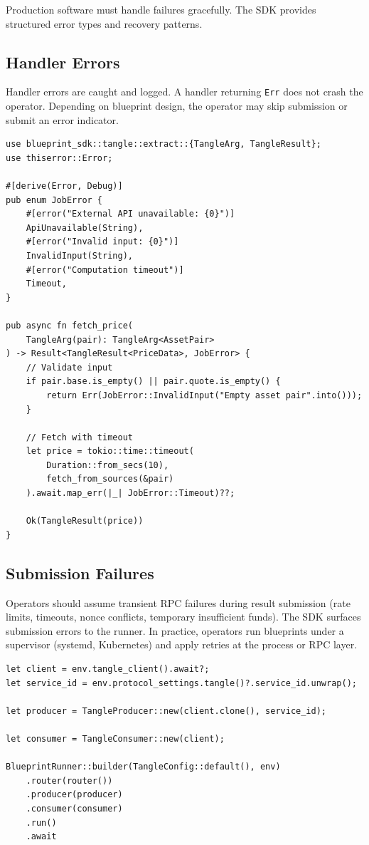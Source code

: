 \documentclass[11pt,a4paper]{article}
\begin{document}
Production software must handle failures gracefully. The SDK provides structured error types and recovery patterns.

\subsection{Handler Errors}

Handler errors are caught and logged. A handler returning \texttt{Err} does not crash the operator. Depending on blueprint design, the operator may skip submission or submit an error indicator.

\begin{lstlisting}
use blueprint_sdk::tangle::extract::{TangleArg, TangleResult};
use thiserror::Error;

#[derive(Error, Debug)]
pub enum JobError {
    #[error("External API unavailable: {0}")]
    ApiUnavailable(String),
    #[error("Invalid input: {0}")]
    InvalidInput(String),
    #[error("Computation timeout")]
    Timeout,
}

pub async fn fetch_price(
    TangleArg(pair): TangleArg<AssetPair>
) -> Result<TangleResult<PriceData>, JobError> {
    // Validate input
    if pair.base.is_empty() || pair.quote.is_empty() {
        return Err(JobError::InvalidInput("Empty asset pair".into()));
    }

    // Fetch with timeout
    let price = tokio::time::timeout(
        Duration::from_secs(10),
        fetch_from_sources(&pair)
    ).await.map_err(|_| JobError::Timeout)??;

    Ok(TangleResult(price))
}
\end{lstlisting}

\subsection{Submission Failures}

Operators should assume transient RPC failures during result submission (rate limits, timeouts, nonce conflicts, temporary insufficient funds). The SDK surfaces submission errors to the runner. In practice, operators run blueprints under a supervisor (systemd, Kubernetes) and apply retries at the process or RPC layer.

\begin{lstlisting}
let client = env.tangle_client().await?;
let service_id = env.protocol_settings.tangle()?.service_id.unwrap();

let producer = TangleProducer::new(client.clone(), service_id);

let consumer = TangleConsumer::new(client);

BlueprintRunner::builder(TangleConfig::default(), env)
    .router(router())
    .producer(producer)
    .consumer(consumer)
    .run()
    .await
\end{lstlisting}
\end{document}
